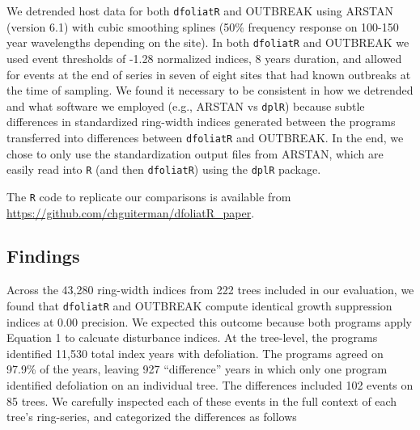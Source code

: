 \documentclass[review]{elsarticle} %
\begin{document}
We detrended host data for both \texttt{dfoliatR} and OUTBREAK using ARSTAN (version 6.1) with cubic smoothing splines (50\% frequency response on 100-150 year wavelengths depending on the site). In both \texttt{dfoliatR} and OUTBREAK we used event thresholds of -1.28 normalized indices, 8 years duration, and allowed for events at the end of series in seven of eight sites that had known outbreaks at the time of sampling. We found it necessary to be consistent in how we detrended and what software we employed (e.g., ARSTAN vs \texttt{dplR}) because subtle differences in standardized ring-width indices generated between the programs transferred into differences between \texttt{dfoliatR} and OUTBREAK. In the end, we chose to only use the standardization output files from ARSTAN, which are easily read into \texttt{R} (and then \texttt{dfoliatR}) using the \texttt{dplR} package.

The \texttt{R} code to replicate our comparisons is available from \url{https://github.com/chguiterman/dfoliatR_paper}.

\hypertarget{findings}{%
\subsection{Findings}\label{findings}}

Across the 43,280 ring-width indices from 222 trees included in our evaluation, we found that \texttt{dfoliatR} and OUTBREAK compute identical growth suppression indices at 0.00 precision. We expected this outcome because both programs apply Equation 1 to calcuate disturbance indices. At the tree-level, the programs identified 11,530 total index years with defoliation. The programs agreed on 97.9\% of the years, leaving 927 ``difference'' years in which only one program identified defoliation on an individual tree. The differences included 102 events on 85 trees. We carefully inspected each of these events in the full context of each tree's ring-series, and categorized the differences as follows
\end{document}
